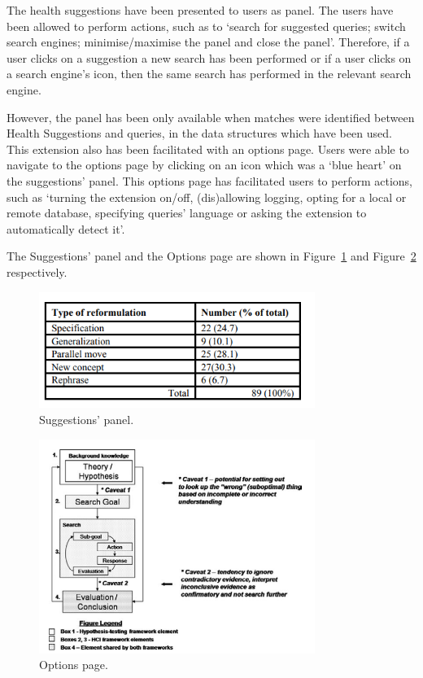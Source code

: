 \documentclass[]{article}
\begin{document}
The health suggestions have been presented to users as panel. The users have been allowed to perform actions, such as to ‘search for suggested queries; switch search engines; minimise/maximise the panel and close the panel’. Therefore, if a user clicks on a suggestion a new search has been performed or if a user clicks on a search engine’s icon, then the same search has performed in the relevant search engine. 

However, the panel has been only available when matches were identified between Health Suggestions and queries, in the data structures which have been used. This extension also has been facilitated with an options page. Users were able to navigate to the options page by clicking on an icon which was a ‘blue heart’ on the suggestions' panel. This options page has facilitated users to perform actions, such as ‘turning the extension on/off, (dis)allowing logging, opting for a local or remote database, specifying queries’ language or asking the extension to automatically detect it’.     

The Suggestions' panel and the Options page are shown in Figure~\ref{fig4} and Figure~\ref{fig5} respectively.

\begin{figure}[b!]
	\includegraphics[width=0.8\textwidth]{Capture4.png}
	\caption{Suggestions' panel. \label{fig4}}
\end{figure}  


\begin{figure}[t!]
	\includegraphics[width=0.8\textwidth]{Capture5.png}
	\caption{Options page. \label{fig5}}
\end{figure} 
\end{document}

